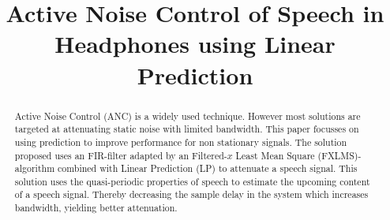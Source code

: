 \documentclass[conference]{IEEEtran}
\begin{document}
\title{Active Noise Control of Speech in Headphones using Linear Prediction}

\author{
}

\maketitle

\begin{abstract}
Active Noise Control (ANC) is a widely used technique. However most solutions are targeted at attenuating static noise with limited bandwidth. This paper focusses on using prediction to improve performance for non stationary signals.
The solution proposed uses an FIR-filter adapted by an Filtered-$x$ Least Mean Square (FXLMS)-algorithm combined with Linear Prediction (LP) to attenuate a speech signal. This solution uses the quasi-periodic properties of speech to estimate the upcoming content of a speech signal. Thereby decreasing the sample delay in the system which increases bandwidth, yielding better attenuation.
\end{abstract}

\IEEEpeerreviewmaketitle












\end{document}
